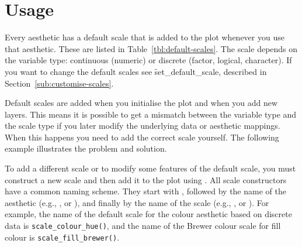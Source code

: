 \section{Usage}
\label{sec:scale-usage}

Every aesthetic has a default scale that is added to the plot whenever you use that aesthetic. These are listed in Table~\ref{tbl:default-scales}. The scale depends on the variable type: continuous (numeric) or discrete (factor, logical, character). If you want to change the default scales see \f{set_default_scale}, described in Section~\ref{sub:customise-scales}. 

Default scales are added when you initialise the plot and when you add new layers. This means it is possible to get a mismatch between the variable type and the scale type if you later modify the underlying data or aesthetic mappings. When this happens you need to add the correct scale yourself. The following example illustrates the problem and solution.

% 
% 
% 


To add a different scale or to modify some features of the default scale, you must construct a new scale and then add it to the plot using \code{+}. All scale constructors have a common naming scheme.  They start with , followed by the name of the aesthetic (e.g., ,  or ), and finally by the name of the scale (e.g., ,  or ). For example, the name of the default scale for the colour aesthetic based on discrete data is {\tt scale\_colour\_hue()}, and the name of the Brewer colour scale for fill colour is {\tt scale\_fill\_brewer()}.


